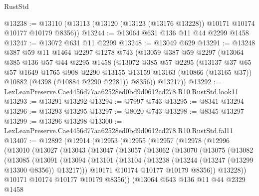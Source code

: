 \begin{lexlean}{RustStd}
\begin{coremodule}
@13238 := @13110 (@13113 (@13120 (@13123 (@13176 @13228)) @10171 @10174 @10177 @10179 @8356))
@13244 := @13064 @631 @136 @11 @44 @2299 @1458
@13247 := @13072 @631 @11 @2299
@13248 := @13049 @629
@13291 := @13248
    @387
    @59
    @11
    @1464
    @2297
    @1278
    @743
    (@13059
      @387
      @59
      @2297
      (@13064
        @385
        @136
        @57
        @44
        @2295
        @1458
        (@13072
          @385
          @57
          @2295
          (@13137
            @37
            @65
            @57
            @1649
            @1765
            @908
            @2290
            @13155
            @13159
            @13163
            (@10866 (@13165 @37))
            @10882
            (@4398 (@10884 @2290 @2281))
            @8356))
        @13217))
@13292 := LexLeanPreserve.Cae4456d77aa62528ed0bd9d0612cd278.R10.RustStd.look11
@13293 := @13291 @13292
@13294 := @7997 @743
@13295 := @8341 @13294
@13296 := @13293 @13295
@13297 := @8020 @743
@13298 := @8345 @13297
@13299 := @13296 @13298
@13300 := LexLeanPreserve.Cae4456d77aa62528ed0bd9d0612cd278.R10.RustStd.fal11
@13407 := @12892
    (@12914
      (@12953
        (@12955
          (@12957
            (@12978
              (@12996
                (@13010
                  (@13027
                    (@13043
                      (@13047
                        (@13057
                          (@13062
                            (@13070
                              (@13075
                                (@13082
                                  (@13085
                                    (@13091
                                      (@13094
                                        (@13101
                                          (@13104
                                            (@13238 (@13244 (@13247 (@13299 @13300 @8356)) @13217)))
                                          @10171
                                          @10174
                                          @10177
                                          @10179
                                          @8356))
                                      @13228))
                                  @10171
                                  @10174
                                  @10177
                                  @10179
                                  @8356))
                              (@13064
                                @643
                                @136
                                @11
                                @44
                                @2329
                                @1458

\end{coremodule}
\end{lexlean}
